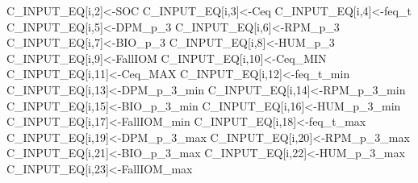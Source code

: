 \documentclass[
  10pt,
  b5paper,
]{book}
\newenvironment{Shaded}{\begin{snugshade}}{\end{snugshade}}
\newcommand{\DecValTok}[1]{\textcolor[rgb]{0.00,0.00,0.81}{#1}}
\newcommand{\NormalTok}[1]{#1}
\newcommand{\OtherTok}[1]{\textcolor[rgb]{0.56,0.35,0.01}{#1}}
\begin{document}
\begin{Shaded}
\begin{Highlighting}[]
\NormalTok{C\_INPUT\_EQ[i,}\DecValTok{2}\NormalTok{]}\OtherTok{\textless{}{-}}\NormalTok{SOC}
\NormalTok{C\_INPUT\_EQ[i,}\DecValTok{3}\NormalTok{]}\OtherTok{\textless{}{-}}\NormalTok{Ceq}
\NormalTok{C\_INPUT\_EQ[i,}\DecValTok{4}\NormalTok{]}\OtherTok{\textless{}{-}}\NormalTok{feq\_t}
\NormalTok{C\_INPUT\_EQ[i,}\DecValTok{5}\NormalTok{]}\OtherTok{\textless{}{-}}\NormalTok{DPM\_p\_3}
\NormalTok{C\_INPUT\_EQ[i,}\DecValTok{6}\NormalTok{]}\OtherTok{\textless{}{-}}\NormalTok{RPM\_p\_3}
\NormalTok{C\_INPUT\_EQ[i,}\DecValTok{7}\NormalTok{]}\OtherTok{\textless{}{-}}\NormalTok{BIO\_p\_3}
\NormalTok{C\_INPUT\_EQ[i,}\DecValTok{8}\NormalTok{]}\OtherTok{\textless{}{-}}\NormalTok{HUM\_p\_3}
\NormalTok{C\_INPUT\_EQ[i,}\DecValTok{9}\NormalTok{]}\OtherTok{\textless{}{-}}\NormalTok{FallIOM}
\NormalTok{C\_INPUT\_EQ[i,}\DecValTok{10}\NormalTok{]}\OtherTok{\textless{}{-}}\NormalTok{Ceq\_MIN}
\NormalTok{C\_INPUT\_EQ[i,}\DecValTok{11}\NormalTok{]}\OtherTok{\textless{}{-}}\NormalTok{Ceq\_MAX}
\NormalTok{C\_INPUT\_EQ[i,}\DecValTok{12}\NormalTok{]}\OtherTok{\textless{}{-}}\NormalTok{feq\_t\_min}
\NormalTok{C\_INPUT\_EQ[i,}\DecValTok{13}\NormalTok{]}\OtherTok{\textless{}{-}}\NormalTok{DPM\_p\_3\_min}
\NormalTok{C\_INPUT\_EQ[i,}\DecValTok{14}\NormalTok{]}\OtherTok{\textless{}{-}}\NormalTok{RPM\_p\_3\_min}
\NormalTok{C\_INPUT\_EQ[i,}\DecValTok{15}\NormalTok{]}\OtherTok{\textless{}{-}}\NormalTok{BIO\_p\_3\_min}
\NormalTok{C\_INPUT\_EQ[i,}\DecValTok{16}\NormalTok{]}\OtherTok{\textless{}{-}}\NormalTok{HUM\_p\_3\_min}
\NormalTok{C\_INPUT\_EQ[i,}\DecValTok{17}\NormalTok{]}\OtherTok{\textless{}{-}}\NormalTok{FallIOM\_min}
\NormalTok{C\_INPUT\_EQ[i,}\DecValTok{18}\NormalTok{]}\OtherTok{\textless{}{-}}\NormalTok{feq\_t\_max}
\NormalTok{C\_INPUT\_EQ[i,}\DecValTok{19}\NormalTok{]}\OtherTok{\textless{}{-}}\NormalTok{DPM\_p\_3\_max}
\NormalTok{C\_INPUT\_EQ[i,}\DecValTok{20}\NormalTok{]}\OtherTok{\textless{}{-}}\NormalTok{RPM\_p\_3\_max}
\NormalTok{C\_INPUT\_EQ[i,}\DecValTok{21}\NormalTok{]}\OtherTok{\textless{}{-}}\NormalTok{BIO\_p\_3\_max}
\NormalTok{C\_INPUT\_EQ[i,}\DecValTok{22}\NormalTok{]}\OtherTok{\textless{}{-}}\NormalTok{HUM\_p\_3\_max}
\NormalTok{C\_INPUT\_EQ[i,}\DecValTok{23}\NormalTok{]}\OtherTok{\textless{}{-}}\NormalTok{FallIOM\_max}


\end{Highlighting}
\end{Shaded}
\end{document}
